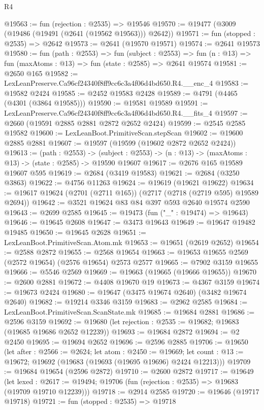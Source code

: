 \begin{lexlean}{R4}
\begin{coremodule}
@19563 := fun (rejection : @2535) => @19546
@19570 := @19477 (@3009 (@19486 (@19491 (@2641 (@19562 @19563))) @2642))
@19571 := fun (stopped : @2535) => @2642
@19573 := @2641 (@19570 @19571)
@19574 := @2641 @19573
@19580 := fun (path : @2553) =>
  fun (subject : @2553) =>
  fun (n : @13) => fun (maxAtoms : @13) => fun (state : @2585) => @2641 @19574
@19581 := @2650 @165
@19582 := LexLeanPreserve.Ca96cf24340f8ff9cc6c3a4f06d4bd650.R4.__enc_4
@19583 := @19582 @2424
@19585 := @2452 @19583 @2428
@19589 := @4791 (@4465 (@4301 (@3864 @19585)))
@19590 := @19581 @19589
@19591 := LexLeanPreserve.Ca96cf24340f8ff9cc6c3a4f06d4bd650.R4.__fits_4
@19597 := @2660 (@19591 @2885 @2881 @2872 @2652 @2424)
@19599 := @2545 @2585 @19582
@19600 := LexLeanBoot.PrimitiveScan.stepScan
@19602 := @19600 @2885 @2881
@19607 := @19597 (@19599 (@19602 @2872 @2652 @2424))
@19613 := (path : @2553) ->
  (subject : @2553) -> (n : @13) -> (maxAtoms : @13) -> (state : @2585) -> @19590 @19607
@19617 := @2676 @165 @19589 @19607 @595
@19619 := @2684 (@3419 @19583)
@19621 := @2684 (@3250 @3863)
@19622 := @4756 @11263
@19624 := @19619 (@19621 @19622)
@19634 := @19617 @19624 (@2701 (@2711 @165)) (@2717 (@2718 (@2719 @595) @19589 @2694))
@19642 := @3521 @19624 @83 @84 @397 @593 @2640 @19574 @2590
@19643 := @2699 @2585
@19645 := @19473 (fun ("_" : @19474) => @19643)
@19646 := @19645 @2608
@19647 := @3473 @19643
@19649 := @19647 @19482 @19485
@19650 := @19645 @2628
@19651 := LexLeanBoot.PrimitiveScan.Atom.mk
@19653 := @19651 (@2619 @2652)
@19654 := @2588 @2872
@19655 := @2568 @19654
@19663 := @19653 @19655 @2569 (@2572 @19654) (@2576 @19654) @2573 @2577
@19665 := @7902 @3159 @19655
@19666 := @5546 @2569
@19669 := @19663 (@19665 (@19666 @19655))
@19670 := @2600 @2881
@19672 := @4408 @19670 @19
@19673 := @4367 @3159
@19674 := @19673 @2424
@19680 := @19647 (@3475 @19674 @2640) (@3482 @19674 @2640)
@19682 := @19214 @3346 @3159
@19683 := @2962 @2585
@19684 := LexLeanBoot.PrimitiveScan.ScanState.mk
@19685 := @19684 @2881
@19686 := @2596 @3159
@19692 := @19680 (let rejection : @2535 := @19682; @19683 (@19685 @19686 @2652 @12239))
@19693 := @19684 @2872
@19694 := @2 @2450
@19695 := @19694 @2652
@19696 := @2596 @2885
@19706 := @19650
    (let after : @2566 := @2624;
    let atom : @2450 := @19669;
    let count : @13 := @19672; @19692 (@19683 (@19693 (@19695 @19696) @2424 @12213)))
@19709 := @19684 @19654 (@2596 @2872)
@19710 := @2600 @2872
@19717 := @19649
    (let lexed : @2617 := @19494; @19706 (fun (rejection : @2535) => @19683 (@19709 @19710 @12239)))
@19718 := @2914 @2585
@19720 := @19646 (@19717 @19718)
@19721 := fun (stopped : @2535) => @19718

\end{coremodule}
\end{lexlean}
